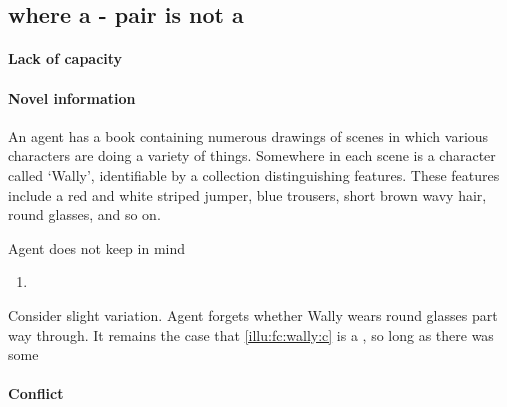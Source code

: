 \subsection{ where a - pair is not a \fc{}}

\paragraph*{Lack of capacity}



\paragraph*{Novel information}

\begin{note}
  \begin{scenario}
    \label{illu:fc:wally}
    An agent has a book containing numerous drawings of scenes in which various characters are doing a variety of things.
    Somewhere in each scene is a character called `Wally', identifiable by a collection distinguishing features.
    These features include a red and white striped jumper, blue trousers, short brown wavy hair, round glasses, and so on.
  \end{scenario}

  Agent does not keep in mind 

  \begin{enumerate}[label=C\thescenarioCounter., ref=(C\thescenarioCounter)]
  \item
    \label{illu:fc:wally:c}
  \end{enumerate}

  Consider slight variation.
  Agent forgets whether Wally wears round glasses part way through.
  It remains the case that \ref{illu:fc:wally:c} is a \fc{}, so long as there was some 
\end{note}

\paragraph*{Conflict}

